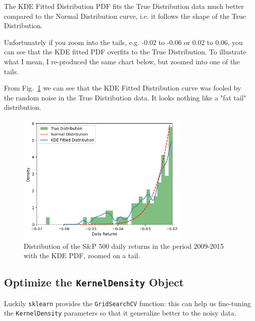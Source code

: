 The KDE Fitted Distribution PDF fits the True Distribution data much better compared to the Normal Distribution curve, i.e. it follows the shape of the True Distribution.

Unfortunately if you zoom into the tails, e.g. -0.02 to -0.06 or 0.02 to 0.06, you can see that the KDE fitted PDF overfits to the True Distribution. To illustrate what I mean, I re-produced the same chart below, but zoomed into one of the tails.

From Fig.~\ref{fig:kde_kde_spy_zoomed} we can see that the KDE Fitted Distribution curve was fooled by the random noise in the True Distribution data. It looks nothing like a "fat tail" distribution.

\begin{figure}[htb]
\centering
\includegraphics[width=0.75\textwidth]{figures/kde_kde_spy_zoomed}
\caption{Distribution of the S\&P 500 daily returns in the period 2009-2015 with the KDE PDF, zoomed on a tail.}
\label{fig:kde_kde_spy_zoomed}
\end{figure}

\subsection{Optimize the \texttt{KernelDensity} Object}

Luckily \texttt{sklearn} provides the \texttt{GridSearchCV} function: this can help us fine-tuning the \texttt{KernelDensity} parameters so that it generalize better to the noisy data.

